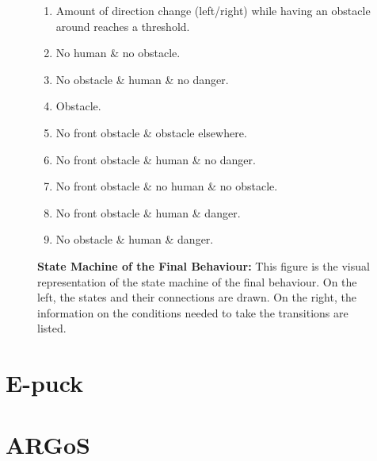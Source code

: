 \documentclass[oneside, a4paper, 12pt]{memoir}
\let\oldCaption\caption
\renewcommand{\caption}[2]{
\oldCaption[#1]{{\small\sffamily\bfseries #1:} #2}
}
\begin{document}
\begin{figure}[!h]
\begin{minipage}[c]{.49\textwidth}
{\begin{tikzpicture}[->, >=stealth', shorten >=1pt, auto, node distance=4cm, semithick]
		\end{tikzpicture}
		}
	\end{minipage}
	\hfill
	\begin{minipage}[c]{.49\textwidth}
		\small\sffamily
		
		\begin{enumerate}
			\item Amount of direction change (left/right) while having an obstacle around reaches a threshold.
			\item No human \& no obstacle.
			\item No obstacle \& human \& no danger.
			\item Obstacle.
			\item No front obstacle \& obstacle elsewhere.
			\item No front obstacle \& human \& no danger.
			\item No front obstacle \& no human \& no obstacle.
			\item No front obstacle \& human \& danger.
			\item No obstacle \& human \& danger.

			\end{enumerate}

	\end{minipage}
	
	\caption{State Machine of the Final Behaviour}{This figure is the visual representation of the state machine of the final behaviour. On the left, the states and their connections are drawn. On the right, the information on the conditions needed to take the transitions are listed.}
	\label{fig:state_machine_complete}
\end{figure}

\chapter{E-puck}

\chapter{ARGoS}
\end{document}
